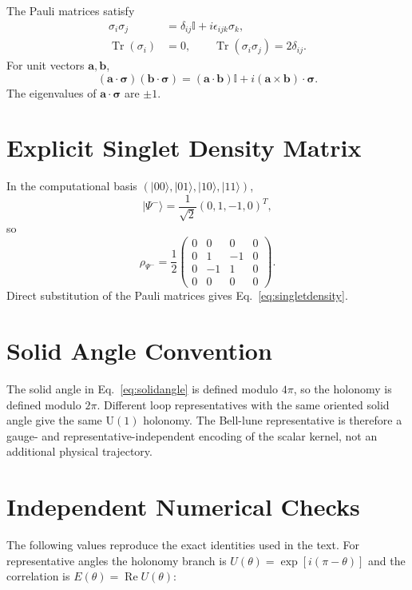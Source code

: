 \documentclass[
  aps,
  pra,
  reprint,
  superscriptaddress,
  nofootinbib,
  longbibliography,
  floatfix,
  amsmath,
  amssymb
]{revtex4-2}
\theoremstyle{plain}
\theoremstyle{definition}
\theoremstyle{remark}
\newcommand{\ket}[1]{\lvert #1\rangle}
\newcommand{\Tr}{\operatorname{Tr}}
\newcommand{\UU}{\mathrm{U}}
\newcommand{\Id}{\mathbb{I}}
\newcommand{\Pauli}{\boldsymbol{\sigma}}
\begin{document}
The Pauli matrices satisfy
\begin{align}
\sigma_i\sigma_j&=\delta_{ij}\Id+i\epsilon_{ijk}\sigma_k,\\
\Tr(\sigma_i)&=0,\qquad
\Tr(\sigma_i\sigma_j)=2\delta_{ij}.
\end{align}
For unit vectors \(\bm a,\bm b\),
\begin{equation}
(\bm a\cdot\Pauli)(\bm b\cdot\Pauli)
=(\bm a\cdot\bm b)\Id+i(\bm a\times\bm b)\cdot\Pauli.
\end{equation}
The eigenvalues of \(\bm a\cdot\Pauli\) are \(\pm1\).

\section{Explicit Singlet Density Matrix}
\label{app:density}

In the computational basis \((\ket{00},\ket{01},\ket{10},\ket{11})\),
\begin{equation}
\ket{\Psi^-}=\frac{1}{\sqrt2}(0,1,-1,0)^T,
\end{equation}
so
\begin{equation}
\rho_{\Psi^-}=\frac12
\begin{pmatrix}
0&0&0&0\\
0&1&-1&0\\
0&-1&1&0\\
0&0&0&0
\end{pmatrix}.
\end{equation}
Direct substitution of the Pauli matrices gives Eq.~\eqref{eq:singletdensity}.

\section{Solid Angle Convention}
\label{app:solidangle}

The solid angle in Eq.~\eqref{eq:solidangle} is defined modulo \(4\pi\), so the holonomy is defined modulo \(2\pi\).  Different loop representatives with the same oriented solid angle give the same \(\UU(1)\) holonomy.  The Bell-lune representative is therefore a gauge- and representative-independent encoding of the scalar kernel, not an additional physical trajectory.


\section{Independent Numerical Checks}
\label{app:checks}

The following values reproduce the exact identities used in the text.  For representative angles the holonomy branch is $U(\theta)=\exp[i(\pi-\theta)]$ and the correlation is $E(\theta)=\operatorname{Re}U(\theta)$:
\end{document}
